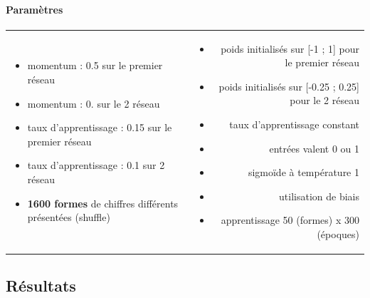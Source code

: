     \paragraph{Paramètres}
      \begin{center}
	\begin{tabular}{lr}
	  \begin{minipage}{230px}
	    \begin{itemize}
	      \item momentum : 0.5 sur le premier réseau
	      \item momentum : 0. sur le 2\up{ème} réseau
	      \item taux d'apprentissage : 0.15 sur le premier réseau
	      \item taux d'apprentissage : 0.1 sur 2\up{ème} réseau
	      \item \textbf{1600 formes} de chiffres différents présentées (shuffle) \cite{Handwritten_256}
	      
	      
	    \end{itemize}
	  \end{minipage}
	  &
	  \begin{minipage}{230px}
	    \begin{itemize}
	      \item poids initialisés sur [-1 ; 1] pour le premier réseau
	      \item poids initialisés sur [-0.25 ; 0.25] pour le 2\up{ème} réseau
	      \item taux d'apprentissage constant
	      \item entrées valent 0 ou 1
	      \item sigmoïde à température 1
	      \item utilisation de biais
	      \item apprentissage 50 (formes) x 300 (époques)
	    \end{itemize}
	  \end{minipage}
	\end{tabular}
      \end{center}
  
  \newpage
  \subsection{Résultats}
